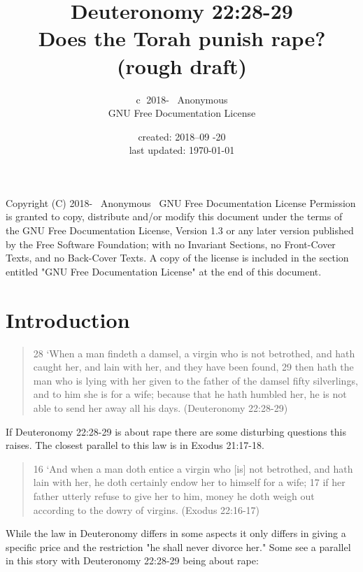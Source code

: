 \documentclass[11pt]{article}
\title{\textbf{Deuteronomy 22:28-29} \large \\ Does the Torah punish rape? (rough draft) }
\author{\textcircled{c} 2018-\the\year
 \ Anonymous \\ GNU Free Documentation License  }
\date{created: 2018--09 -20 \\ last updated: \today{}}
\begin{document}
\maketitle
\tableofcontents 

\noindent \newline Copyright (C) 2018-\the\year
 \ Anonymous \ GNU Free Documentation License \newline
Permission is granted to copy, distribute and/or modify this document\newline
under the terms of the GNU Free Documentation License, Version 1.3\newline
or any later version published by the Free Software Foundation;\newline
with no Invariant Sections, no Front-Cover Texts, and no Back-Cover Texts.\newline
A copy of the license is included in the section entitled "GNU\newline
Free Documentation License" at the end of this document.

\section{Introduction}

\begin{quote}
28 `When a man findeth a damsel, a virgin who is not betrothed, and hath caught her, and lain with her, and they have been found,
29 then hath the man who is lying with her given to the father of the damsel fifty silverlings, and to him she is for a wife; because that he hath humbled her, he is not able to send her away all his days. (Deuteronomy 22:28-29)
\end{quote}

If Deuteronomy 22:28-29 is about rape there are some disturbing questions this raises. The closest parallel to this law is in Exodus 21:17-18.

\begin{quote}
16 `And when a man doth entice a virgin who [is] not betrothed, and hath lain with her, he doth certainly endow her to himself for a wife;
17 if her father utterly refuse to give her to him, money he doth weigh out according to the dowry of virgins. (Exodus 22:16-17)
\end{quote}

While the law in Deuteronomy differs in some aspects it only differs in giving a specific price and the restriction "he shall never divorce her." Some see a parallel in this story with Deuteronomy 22:28-29 being about rape:
\end{document}
